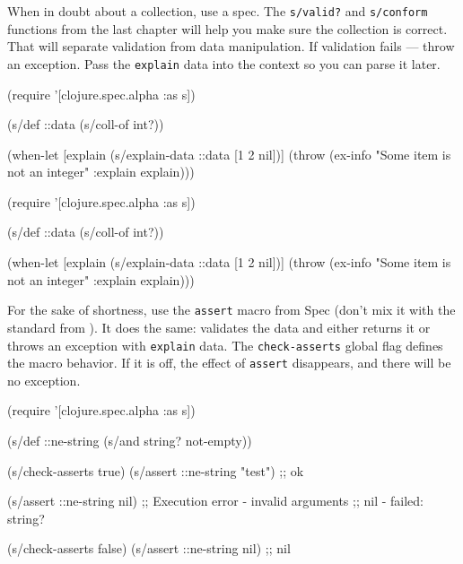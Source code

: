 
When in doubt about a collection, use a spec. The \verb|s/valid?| and \verb|s/conform| functions from the last chapter  will help you make sure the collection is correct. That will separate validation from data manipulation. If validation fails — throw an exception. Pass the \verb|explain| data into the context so you can parse it later.

\ifnarrow

\begin{clojure}
(require '[clojure.spec.alpha :as s])

(s/def ::data (s/coll-of int?))

(when-let [explain (s/explain-data
                     ::data
                     [1 2 nil])]
  (throw (ex-info
           "Some item is not an integer"
           {:explain explain})))
\end{clojure}

\else

\begin{clojure}
(require '[clojure.spec.alpha :as s])

(s/def ::data (s/coll-of int?))

(when-let [explain (s/explain-data ::data [1 2 nil])]
  (throw (ex-info "Some item is not an integer"
                  {:explain explain})))
\end{clojure}

\fi


For the sake of shortness, use the \verb|assert| macro from Spec (don't mix it with the standard  from ). It does the same: validates the data and either returns it or throws an exception with \verb|explain| data. The \verb|check-asserts| global flag defines the macro behavior. If it is off, the effect of \verb|assert| disappears, and there will be no exception.

\ifx\DEVICETYPE\MOBILE

\begin{clojure}
(require '[clojure.spec.alpha :as s])

(s/def ::ne-string
  (s/and string? not-empty))

(s/check-asserts true)
(s/assert ::ne-string "test") ;; ok

(s/assert ::ne-string nil)
;; Execution error - invalid arguments
;; nil - failed: string?

(s/check-asserts false)
(s/assert ::ne-string nil) ;; nil
\end{clojure}

